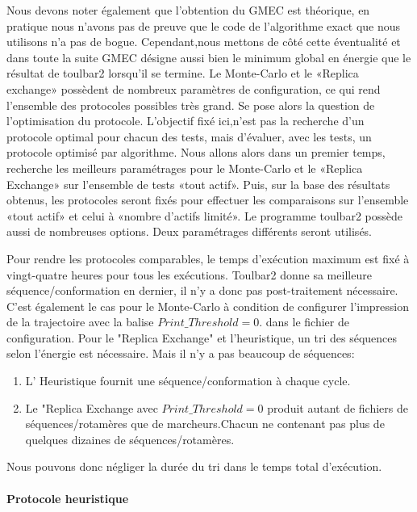 Nous devons noter également que l'obtention du GMEC est théorique, en pratique nous n'avons pas de preuve que le code de l'algorithme exact que nous utilisons n'a pas de bogue. Cependant,nous mettons de côté cette éventualité et dans toute la suite GMEC désigne aussi bien le minimum global en énergie que le résultat de toulbar2 lorsqu'il se termine.  
Le Monte-Carlo et le «Replica exchange» possèdent de nombreux paramètres de configuration, ce qui rend l'ensemble des protocoles possibles très grand. Se pose alors la question de l'optimisation du protocole. L'objectif fixé ici,n'est pas la recherche d'un protocole optimal pour chacun des tests, mais d'évaluer, avec les tests, un protocole optimisé par algorithme.
Nous allons alors dans un premier temps, recherche les meilleurs paramétrages pour le Monte-Carlo et le «Replica Exchange» sur l'ensemble de tests «tout actif».
Puis, sur la base des résultats obtenus, les protocoles seront fixés pour effectuer les comparaisons sur l'ensemble  «tout actif» et celui à «nombre d'actifs limité».
Le programme toulbar2 possède aussi de nombreuses options. Deux paramétrages différents seront utilisés.

Pour rendre les protocoles comparables, le temps d'exécution maximum est fixé à vingt-quatre heures pour tous les exécutions.
Toulbar2 donne sa meilleure séquence/conformation en dernier, il n'y a donc pas post-traitement nécessaire.
C'est également le cas pour le Monte-Carlo à condition de configurer l'impression de la trajectoire avec la balise $Print\_Threshold=0$. dans le fichier de configuration.
Pour le "Replica Exchange" et l'heuristique, un tri des séquences selon l'énergie est nécessaire. Mais il n'y a pas beaucoup de séquences: 
\begin{enumerate}
\item L' Heuristique fournit une séquence/conformation à chaque cycle.
\item Le "Replica Exchange avec $Print\_Threshold=0$ produit autant de fichiers de séquences/rotamères que de marcheurs.Chacun ne contenant pas plus de quelques dizaines de séquences/rotamères. 
 \end{enumerate}

Nous pouvons donc négliger la durée du tri dans le temps total d'exécution.    

\paragraph{Protocole heuristique}

